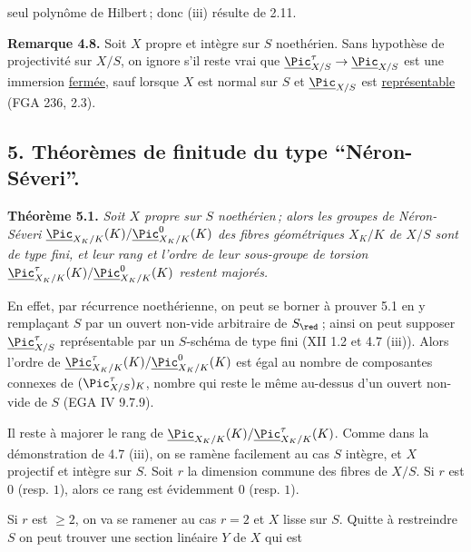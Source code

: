 
seul polyn\^ome de Hilbert\,; donc (iii) r\'esulte de 2.11.

\textbf{Remarque 4.8.} Soit \(X\) propre et int\`egre sur \(S\) noeth\'erien. Sans hypoth\`ese de projectivit\'e sur \(X/S\), on ignore s'il reste vrai que \(\underline{\Pic}^\tau_{X/S}\to\underline{\Pic}_{X/S}\) est une immersion \uline{ferm\'ee}, sauf lorsque \(X\) est normal sur \(S\) et \(\underline{\Pic}_{X/S}\) est \uline{repr\'esentable} (FGA 236, 2.3).

\providecommand{\NS}{\operatorname{NS}}
\providecommand{\Picard}{\operatorname{Pic}}
\providecommand{\Et}{\mathrm{et}}
\providecommand{\rk}{\operatorname{rk}}
\providecommand{\im}{\operatorname{Im}}
\providecommand{\HH}{\mathrm H}


\subsection*{5. Th\'eor\`emes de finitude du type ``N\'eron-S\'everi''.}

\textbf{Th\'eor\`eme 5.1.} \emph{Soit \(X\) propre sur \(S\) noeth\'erien\,; alors les groupes de N\'eron-S\'everi \(\underline{\Pic}_{X_K/K}(K)/\underline{\Pic}^0_{X_K/K}(K)\) des fibres g\'eom\'etriques \(X_K/K\) de \(X/S\) sont de type fini, et leur rang et l'ordre de leur sous-groupe de torsion \(\underline{\Pic}^\tau_{X_K/K}(K)/\underline{\Pic}^0_{X_K/K}(K)\) restent major\'es.}

En effet, par r\'ecurrence noeth\'erienne, on peut se borner \`a prouver 5.1 en y rempla\c{c}ant \(S\) par un ouvert non-vide arbitraire de \(S_{\red}\)\,; ainsi on peut supposer \(\underline{\Pic}^\tau_{X/S}\) repr\'esentable par un \(S\)-sch\'ema de type fini (XII 1.2 et 4.7 (iii)). Alors l'ordre de \(\underline{\Pic}^\tau_{X_K/K}(K)/\underline{\Pic}^0_{X_K/K}(K)\) est \'egal au nombre de composantes connexes de \((\Pic^\tau_{X/S})_K\), nombre qui reste le m\^eme au-dessus d'un ouvert non-vide de \(S\) (EGA IV 9.7.9).

Il reste \`a majorer le rang de \(\underline{\Pic}_{X_K/K}(K)/\underline{\Pic}^\tau_{X_K/K}(K)\). Comme dans la d\'emonstration de 4.7 (iii), on se ram\`ene facilement au cas \(S\) int\`egre, et \(X\) projectif et int\`egre sur \(S\). Soit \(r\) la dimension commune des fibres de \(X/S\). Si \(r\) est \(0\) (resp. \(1\)), alors ce rang est \'evidemment \(0\) (resp. \(1\)).

Si \(r\) est \(\ge2\), on va se ramener au cas \(r=2\) et \(X\) lisse sur \(S\). Quitte \`a restreindre \(S\) on peut trouver une section lin\'eaire \(Y\) de \(X\) qui est
